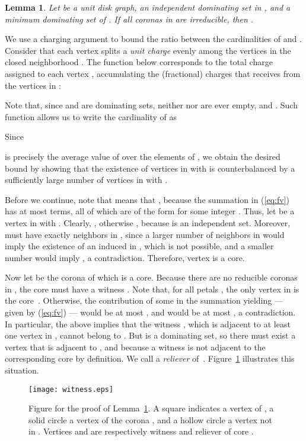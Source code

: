 \documentclass[preprint,12pt]{elsarticle}
\newtheorem{lem}[thm]{Lemma}
\begin{document}
\begin{lem} \label{l:irreducible}
Let  be a unit disk graph,  an independent dominating set in , and  a minimum dominating set of . If all coronas in  are irreducible, then .
\end{lem}
\begin{pf}We use a charging argument to bound the ratio between the cardinalities of  and . Consider that each vertex  splits a \emph{unit charge} evenly among the vertices in the closed neighborhood . The function  below corresponds to the total charge assigned to each vertex , accumulating the (fractional) charges that  receives from the vertices in :


Note that, since  and  are dominating sets, neither  nor  are ever empty, and . Such function  allows us to write the cardinality of  as


Since

is precisely the average value of  over the elements of , we obtain the desired bound  by showing that the existence of vertices  \linebreak in  with  is counterbalanced by a sufficiently large number of vertices  in  with .

Before we continue, note that  means that , because the summation in (\ref{eq:fv}) has at most  terms, all of which are of the form  for some integer .
Thus, let  be a vertex in  with . Clearly, , otherwise , because  is an independent set. Moreover,  must have exactly  neighbors in , since a larger number of neighbors in  would imply the existence of an induced  in , which is not possible, and a smaller number would imply , a contradiction. Therefore, vertex  is a core.

Now let  be the corona of which  is a core. Because there are no reducible coronas in , the core  must have a witness .
Note that, for all petals , the only vertex in  is the core~. Otherwise, the contribution of some  in the summation yielding  --- given by (\ref{eq:fv}) --- would be at most , and  would be at most , a contradiction. In particular, the above implies that the witness , which is adjacent to at least one vertex in , cannot belong to . But  is a dominating set, so there must exist a vertex  that is adjacent \linebreak to , and  because a witness  is not adjacent to the corresponding core by definition. We call  a \emph{reliever} of~. Figure~\ref{f:witness} illustrates this situation.

\begin{figure}
 \centering
 \texttt{[image: witness.eps]}
 \caption{\label{f:witness} Figure for the proof of Lemma~\ref{l:irreducible}. A square indicates a vertex of , a solid circle a vertex of the corona , and a hollow circle a vertex not in . Vertices  and  are respectively witness and reliever of core .}
\end{figure}


\end{pf}
\end{document}
